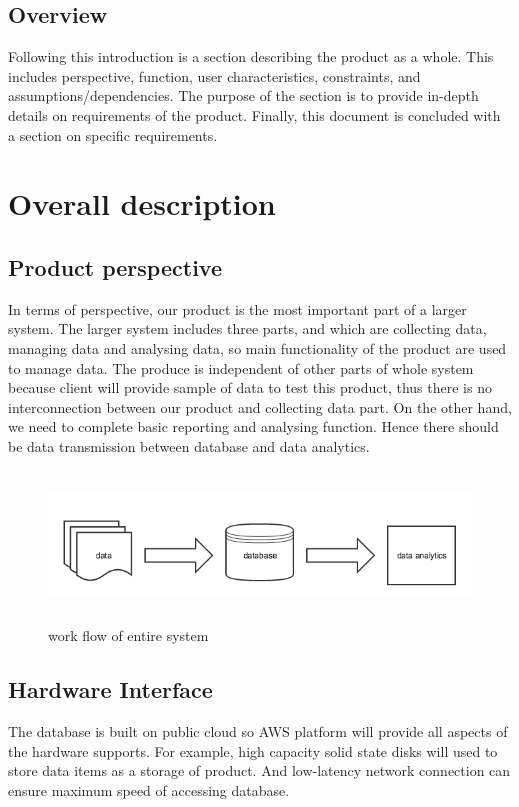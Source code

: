 \documentclass[10pt,draftclsnofoot,onecolumn,journal,compsoc]{IEEEtran}
\begin{document}
        \subsection{Overview}
        Following this introduction is a section describing the product as a whole. This includes perspective, function, user characteristics, constraints, and assumptions/dependencies. The purpose of the section is to provide in-depth details on requirements of the product. Finally, this document is concluded with a section on specific requirements.
   
    \newpage
    
    \section{Overall description}
        \subsection{Product perspective}
        In terms of perspective, our product is the most important part of a larger system. The larger system includes three parts, and which are collecting data, managing data and analysing data, so main functionality of the product are used to manage data. The produce is independent of other parts of whole system because client will provide sample of data to test this product, thus there is no interconnection between our product and collecting data part. On the other hand, we need to complete basic reporting and analysing function. Hence there should be data transmission between database and data analytics.
        \begin{figure}[h]
        \includegraphics[width=15cm, height=4cm]{project.png}
        \centering
        \caption{work flow of entire system}
        \end{figure}
        
       \subsection{Hardware Interface} 
       The database is built on public cloud so AWS platform will provide all aspects of the hardware supports. For example, high capacity solid state disks will used to store data items as a storage of product. And low-latency network connection can ensure maximum speed of accessing database.
\end{document}
